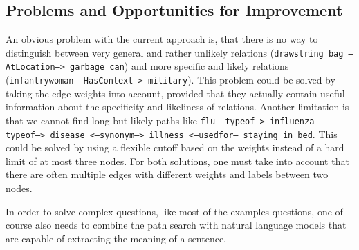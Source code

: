 \documentclass{article}
\begin{document}
\subsection*{Problems and Opportunities for Improvement}
\label{sec:probl-opport-impr}

An obvious problem with the current approach is, that there is no way
to distinguish between very general and rather unlikely relations
(\texttt{drawstring bag --AtLocation--> garbage can}) and more
specific and likely relations (\texttt{infantrywoman --HasContext-->
  military}).  This problem could be solved by taking the edge weights
into account, provided that they actually contain useful information
about the specificity and likeliness of relations.  Another limitation
is that we cannot find long but likely paths like \texttt{flu
  --typeof--> influenza --typeof--> disease <--synonym--> illness
  <--usedfor-- staying in bed}. This could be solved by using a
flexible cutoff based on the weights instead of a hard limit of at
most three nodes.  For both solutions, one must take into account that
there are often multiple edges with different weights and labels
between two nodes.

In order to solve complex questions, like most of the examples questions, one of
course also needs to combine the path search with natural language models
that are capable of extracting the meaning of a sentence.






\end{document}
